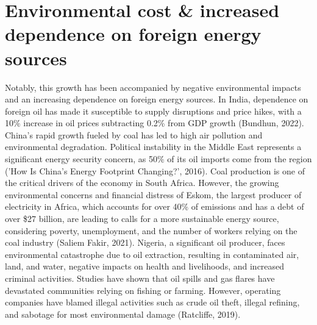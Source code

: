 \documentclass[11pt,a4paper]{article}
\begin{document}
\section*{Environmental cost \& increased dependence on foreign energy sources}
Notably, this growth has been accompanied by negative environmental impacts and an increasing dependence on foreign energy sources. In India, dependence on foreign oil has made it susceptible to supply disruptions and price hikes, with a 10\% increase in oil prices subtracting 0.2\% from GDP growth (Bundhun, 2022). China's rapid growth fueled by coal has led to high air pollution and environmental degradation. Political instability in the Middle East represents a significant energy security concern, as 50\% of its oil imports come from the region ('How Is China's Energy Footprint Changing?', 2016). Coal production is one of the critical drivers of the economy in South Africa. However, the growing environmental concerns and financial distress of Eskom, the largest producer of electricity in Africa, which accounts for over 40\% of emissions and has a debt of over \$27 billion, are leading to calls for a more sustainable energy source, considering poverty, unemployment, and the number of workers relying on the coal industry (Saliem Fakir, 2021). Nigeria, a significant oil producer, faces environmental catastrophe due to oil extraction, resulting in contaminated air, land, and water, negative impacts on health and livelihoods, and increased criminal activities. Studies have shown that oil spills and gas flares have devastated communities relying on fishing or farming. However, operating companies have blamed illegal activities such as crude oil theft, illegal refining, and sabotage for most environmental damage (Ratcliffe, 2019). 
\end{document}
